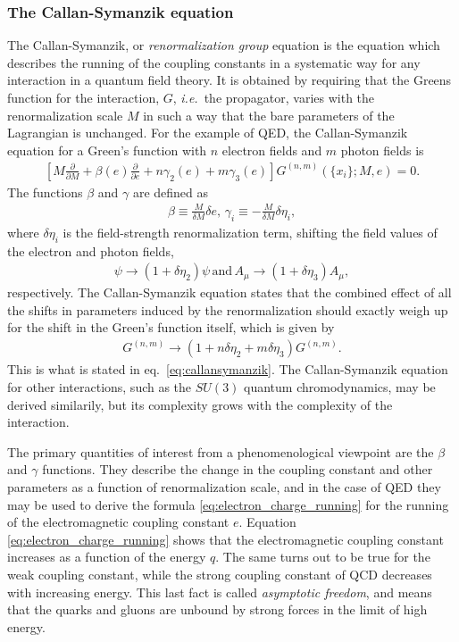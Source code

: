 \subsubsection{The Callan-Symanzik equation}
The Callan-Symanzik, or {\it renormalization group} equation is the equation which describes the running of the coupling constants in a systematic way for any interaction in a quantum field theory. It is obtained by requiring that the Greens function for the interaction, $G$, {\it i.e.}\ the propagator, varies with the renormalization scale $M$ in such a way that the bare parameters of the Lagrangian is unchanged. For the example of QED, the Callan-Symanzik equation for a Green's function with $n$ electron fields and $m$ photon fields is
\begin{align}
	\left[ M \frac{\partial}{\partial M} + \beta(e) \frac{\partial}{\partial e} + n\gamma_2(e) + m\gamma_3(e)\right] G^{(n,m)}(\{ x_i\}; M,e) = 0.\label{eq:callansymanzik}
\end{align}
The functions $\beta$ and $\gamma$ are defined as
\begin{align}
	\beta \equiv \frac{M}{\delta M} \delta e, \, \gamma_i \equiv - \frac{M}{\delta M}\delta \eta_i,
\end{align}
where $\delta\eta_i$ is the field-strength renormalization term, shifting the field values of the electron and photon fields,
\begin{align}
	\psi \to (1 + \delta \eta_2) \psi \, \mathrm{and} \, A_\mu \to (1 + \delta\eta_3) A_\mu,
\end{align}
respectively. The Callan-Symanzik equation states that the combined effect of all the shifts in parameters induced by the renormalization should exactly weigh up for the shift in the Green's function itself, which is given by
\begin{align}
	G^{(n,m)} \to (1 + n\delta\eta_2 + m\delta\eta_3)G^{(n,m)}.
\end{align}
This is what is stated in eq.\ \eqref{eq:callansymanzik}. The Callan-Symanzik equation for other interactions, such as the $SU(3)$ quantum chromodynamics, may be derived similarily, but its complexity grows with the complexity of the interaction.

The primary quantities of interest from a phenomenological viewpoint are the $\beta$ and $\gamma$ functions. They describe the change in the coupling constant and other parameters as a function of renormalization scale, and in the case of QED they may be used to derive the formula \eqref{eq:electron_charge_running} for the running of the electromagnetic coupling constant $e$. Equation \eqref{eq:electron_charge_running} shows that the electromagnetic coupling constant increases as a function of the energy $q$. The same turns out to be true for the weak coupling constant, while the strong coupling constant of QCD decreases with increasing energy. This last fact is called {\it asymptotic freedom}, and means that the quarks and gluons are unbound by strong forces in the limit of high energy. 





